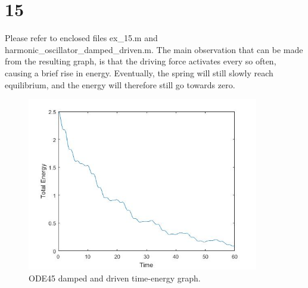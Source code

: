\documentclass[12pt, a4paper]{article}
\begin{document}
	\part*{15}
	Please refer to enclosed files ex\_15.m and harmonic\_oscillator\_damped\_driven.m. The main observation that can be made from the resulting graph, is that the driving force activates every so often, causing a brief rise in energy. Eventually, the spring will still slowly reach equilibrium, and the energy will therefore still go towards zero.
	\begin{figure}[!ht]
		\centering
		\includegraphics[width=0.9\textwidth]{15}
		\caption{ODE45 damped and driven time-energy graph.}
	\end{figure}
\end{document}

